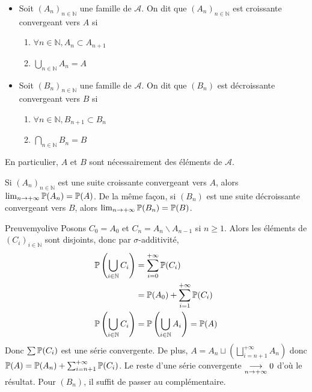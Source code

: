     \begin{defi}{}{}
        \begin{itemize}
            \item Soit $(A_n)_{n \in \mathbb{N}}$ une famille de $\mathcal{A}$. On dit que $(A_n)_{n \in \mathbb{N}}$ est croissante convergeant vers $A$ si 
            \begin{enumerate}
                \item $\forall n \in \mathbb{N}, A_n \subset A_{n +1}$
                \item $\bigcup_{n \in \mathbb{N}} A_n = A$
            \end{enumerate}
            \item Soit $(B_n)_{n \in \mathbb{N}}$ une famille de $\mathcal{A}$. On dit que $(B_n)$ est décroissante convergeant vers $B$ si 
            \begin{enumerate}
                \item $\forall n \in \mathbb{N}, B_{n+1} \subset B_n$
                \item $\bigcap_{n \in \mathbb{N}} B_n = B$
            \end{enumerate}
        \end{itemize}
        En particulier, $A$ et $B$ sont nécessairement des éléments de $\mathcal{A}$.
    \end{defi}

    \begin{prop}{}{}
        Si $(A_n)_{n \in \mathbb{N}}$ est une suite croissante convergeant vers $A$, alors $\lim_{n \to +\infty} \P(A_n) = \P(A)$. De la même façon, si $(B_n)$ est une suite décroissante convergeant vers $B$, alors $\lim_{n \to +\infty} \P(B_n) = \P(B)$.
    \end{prop}

    \begin{demo}{Preuve}{myolive}
        Posons $C_0 = A_0$ et $C_n = A_n \backslash A_{n -1}$ si $n \geq 1$. Alors les éléments de $(C_i)_{i \in \mathbb{N}}$ sont disjoints, donc par $\sigma$-additivité, 
        \begin{align*}
            \P\left(\bigcup_{i \in \mathbb{N}} C_i\right) 
            &= \sum_{i = 0}^{+\infty} \P(C_i) \\
            &= \P(A_0) + \sum_{i=1}^{+\infty} \P(C_i) \\
            \P\left(\bigcup_{i \in \mathbb{N}} C_i\right) &= \P\left(\bigcup_{i \in \mathbb{N}} A_i\right) = \P(A)
        \end{align*}
        Donc $\sum \P(C_i)$ est une série convergente. De plus, $A = A_n \sqcup \left(\bigsqcup_{i = n+1}^{+\infty} A_n\right)$ donc $\P(A) = \P(A_n) + \sum_{i =n+1}^{+\infty} \P(C_i)$. Le reste d’une série convergente $\limi{n}{+\infty} 0$ d’où le résultat. Pour $(B_n)$, il suffit de passer au complémentaire.
    \end{demo}

